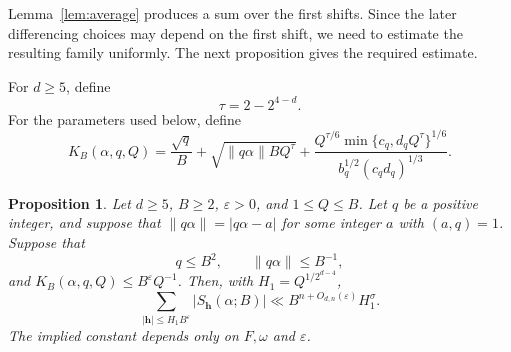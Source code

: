 \documentclass[reqno,a4paper,11pt]{amsart}
\numberwithin{equation}{section}
\newcommand{\h}{\mathbf h}
\newcommand{\eps}{\varepsilon}
\theoremstyle{plain}
\newtheorem{proposition}[theorem]{Proposition}
\theoremstyle{definition}
\begin{document}
Lemma~\ref{lem:average} produces a sum over the first shifts.
Since the later differencing choices may depend on the first shift, we need to estimate the resulting family uniformly.
The next proposition gives the required estimate.

For \(d\geq5\), define
\begin{equation}\label{eq:tau}
 \tau=2-2^{4-d}.
\end{equation}
For the parameters used below, define
\begin{equation}\label{eq:cubic-bound}
 K_B(\alpha,q,Q)
 =\frac{\sqrt q}{B}
 +\sqrt{\|q\alpha\|BQ^\tau}
 +\frac{Q^{\tau/6}\min\{c_q,d_qQ^\tau\}^{1/6}}
 {b_q^{1/2}(c_qd_q)^{1/3}}.
\end{equation}

\begin{proposition}\label{prop:cubic-family}
Let \(d\geq5\), \(B\geq2\), \(\eps>0\), and \(1\leq Q\leq B\).
Let \(q\) be a positive integer, and suppose that \(\|q\alpha\|=|q\alpha-a|\) for some integer \(a\) with \((a,q)=1\).
Suppose that
\[
 q\leq B^2,\qquad \|q\alpha\|\leq B^{-1},
\]
and \(K_B(\alpha,q,Q)\leq B^\eps Q^{-1}\).
Then, with \(H_1=Q^{1/2^{d-4}}\),
\begin{equation}\label{eq:cubic-family}
 \sum_{|\h|\leq H_1B^\eps}|S_{\h}(\alpha;B)|
 \ll B^{n+O_{d,n}(\eps)}H_1^\sigma.
\end{equation}
The implied constant depends only on \(F,\omega\) and \(\eps\).
\end{proposition}
\end{document}
